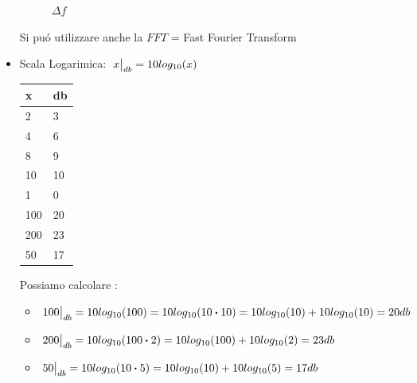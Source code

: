 \begin{itemize}
{\begin{figure}[H]
                    \caption{ $\Delta f$}
                    \label{fig:campionamento MATLAB sinc}
                \end{figure}
                Si puó utilizzare anche la $FFT$ = Fast Fourier Transform
            }
            \item{
                Scala Logarimica: $\eval*{x}_{db}= 10log_{10}(x)$
                \begin{table}[H]
                    \centering
                    \begin{tabular}{l|l}
                        x   & db  \\ 
                        \hline
                        2   & 3   \\
                        4   & 6   \\
                        8   & 9   \\
                        10  & 10  \\
                        1   & 0   \\
                        100 & 20  \\
                        200 & 23  \\
                        50  & 17 
                    \end{tabular}
                \end{table}
                Possiamo calcolare :
                \begin{itemize}
                    \item $\eval*{100}_{db} = 10log_{10}(100) =10log_{10}(10\dotproduct 10) = 10log_{10}(10)+10log_{10}(10) = 20db $
                    \item $\eval*{200}_{db} = 10log_{10}(100\dotproduct 2) = 10log_{10}(100)+10log_{10}(2) = 23db $
                    \item $\eval*{50}_{db} = 10log_{10}(10\dotproduct 5) = 10log_{10}(10)+10log_{10}(5) = 17db $
                \end{itemize}
            }
        \end{itemize}

